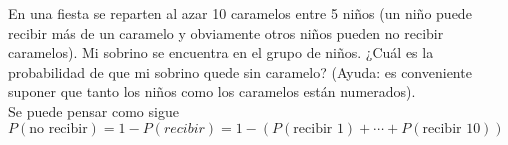 \item En una fiesta se reparten al azar 10 caramelos entre 5 niños (un niño puede recibir más de un caramelo y obviamente otros niños pueden no recibir caramelos). Mi sobrino se encuentra en el grupo de niños. ¿Cuál es la probabilidad de que mi sobrino quede sin caramelo? (Ayuda: es conveniente suponer que tanto los niños como los caramelos están numerados).\e\\
    Se puede pensar como sigue\\
    $P(\text{no recibir})=1-P(recibir)=1-(P(\text{recibir 1})+\cdots+P(\text{recibir 10}))$